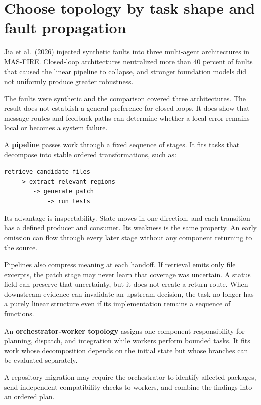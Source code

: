 \section{Choose topology by task shape and fault propagation}\label{choose-topology-by-task-shape-and-fault-propagation}

Jia et al.~(\href{https://arxiv.org/abs/2602.19843}{2026}) injected synthetic faults into three multi-agent architectures in MAS-FIRE. Closed-loop architectures neutralized more than 40 percent of faults that caused the linear pipeline to collapse, and stronger foundation models did not uniformly produce greater robustness.

The faults were synthetic and the comparison covered three architectures. The result does not establish a general preference for closed loops. It does show that message routes and feedback paths can determine whether a local error remains local or becomes a system failure.

A \textbf{pipeline} passes work through a fixed sequence of stages. It fits tasks that decompose into stable ordered transformations, such as:

\begin{verbatim}
retrieve candidate files
    -> extract relevant regions
        -> generate patch
            -> run tests
\end{verbatim}

Its advantage is inspectability. State moves in one direction, and each transition has a defined producer and consumer. Its weakness is the same property. An early omission can flow through every later stage without any component returning to the source.

Pipelines also compress meaning at each handoff. If retrieval emits only file excerpts, the patch stage may never learn that coverage was uncertain. A status field can preserve that uncertainty, but it does not create a return route. When downstream evidence can invalidate an upstream decision, the task no longer has a purely linear structure even if its implementation remains a sequence of functions.

An \textbf{orchestrator-worker topology} assigns one component responsibility for planning, dispatch, and integration while workers perform bounded tasks. It fits work whose decomposition depends on the initial state but whose branches can be evaluated separately.

A repository migration may require the orchestrator to identify affected packages, send independent compatibility checks to workers, and combine the findings into an ordered plan.

